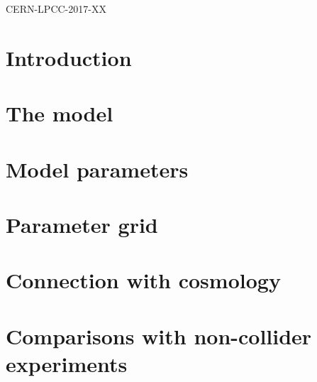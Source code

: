 \documentclass[a4paper, 11pt,notoc]{article}
\begin{document}

\author[25,*]{Tim~M.P.~Tait,}






\hfill CERN-LPCC-2017-XX


\maketitle


\section{Introduction}


\section{The model}


\section{Model parameters}


\section{Parameter grid}


\section{Connection with cosmology}


\section{Comparisons with non-collider experiments}
\end{document}
